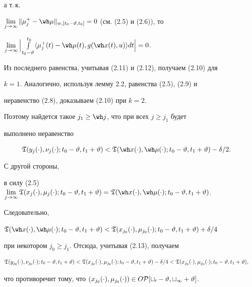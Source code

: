 \begin{pf}
\begin{equation}
\end{equation}


а т.\,к.


$\lim\limits_{j\to\infty}\|\mu_j^+


-\wh\mu\|_{w,[t_0-\vartheta,t_0]}=0$ (см. (2.5) и (2.6)), то


$\lim\limits_{j\to\infty}\Big|\int\limits_{t_0-\vartheta}^{t_0}


\langle\mu_j^+(t)-\wh\mu(t),g(\wh x(t),u)\rangle dt\Big|=0$.


Из последнего равенства, учитывая (2.11) и (2.12), получаем (2.10) для


$k=1$. Аналогично, используя лемму 2.2, равенства (2.5), (2.9) и


неравенство (2.8), доказываем (2.10) при $k=2$.


Поэтому найдется такое $j_1\ge\wh j$, что при всех $j\ge j_1$ будет


выполнено неравенство


\begin{equation}


\frak T(y_j(\cdot),\nu_j(\cdot);t_0-\vartheta,t_1+\vartheta)<


\frak T(\wh x(\cdot),\wh \mu(\cdot);t_0-\vartheta,t_1+\vartheta)-\delta/2.


\end{equation}


С другой стороны, 


в силу (2.5) \ $\lim\limits_{j\to\infty}\frak T(x_j(\cdot),


\mu_j(\cdot);t_0-\vartheta,t_1+\vartheta)=


\frak T(\wh x(\cdot),\wh \mu(\cdot);t_0-\vartheta,t_1+\vartheta)$.


Следовательно,


$\frak T(\wh x(\cdot),\wh \mu(\cdot);t_0-\vartheta,t_1+\vartheta)<


\frak T(x_{j_0}(\cdot),\mu_{j_0}(\cdot);t_0-\vartheta,t_1+\vartheta)+\delta/4$


при некотором $j_0\ge j_1$. Отсюда, учитывая (2.13), получаем


$$


\frak T(y_{j_0}(\cdot),\nu_{j_0}(\cdot);t_0-\vartheta,t_1+\vartheta)<


\frak T(x_{j_0}(\cdot),\mu_{j_0}(\cdot);t_0-\vartheta,t_1+\vartheta)


-\delta/4<\frak T(x_{j_0}(\cdot),\mu_{j_0}(\cdot);t_0-\vartheta,t_1+\vartheta),


$$


что противоречит тому, что $(x_{j_0}(\cdot),\mu_{j_0}(\cdot))\in


O\cal P[t_0-\vartheta,t_1+\vartheta]$.


\end{pf}









